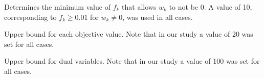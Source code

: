 \begin{description}[leftmargin=1.6cm, style=nextline, itemindent=-10pt]
\item[$M^w$] Determines the minimum value of $f_k$ that allows $w_k$ to not be 0. A value of 10, corresponding to $f_k \ge 0.01$ for $w_k \ne 0$, was used in all cases.
\item[$M^{obj}$] Upper bound for each objective value. Note that in our study a value of 20 was set for all cases.
\item[$M$] Upper bound for dual variables. Note that in our study a value of 100 was set for all cases.
\end{description}

%
%



